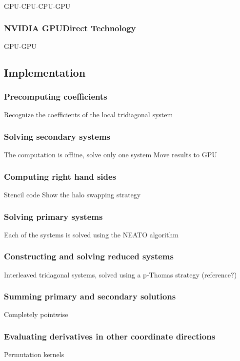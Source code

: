         GPU-CPU-CPU-GPU
        
        \subsubsection{NVIDIA GPUDirect Technology}

        GPU-GPU

    \subsection{Implementation}
        \subsubsection{Precomputing coefficients}
        
        Recognize the coefficients of the
        local tridiagonal system

        \subsubsection{Solving secondary systems}

        The computation is offline,
        solve only one system
        Move results to GPU

        \subsubsection{Computing right hand sides}
    
        Stencil code
        Show the halo swapping strategy

        \subsubsection{Solving primary systems}

        Each of the systems is solved using the NEATO algorithm

        \subsubsection{Constructing and solving reduced systems}
        
        Interleaved tridagonal systems,
        solved using a p-Thomas strategy (reference?)

        \subsubsection{Summing primary and secondary solutions}
        
        Completely pointwise
        
        \subsubsection{Evaluating derivatives in other
            coordinate directions}

        Permutation kernels
